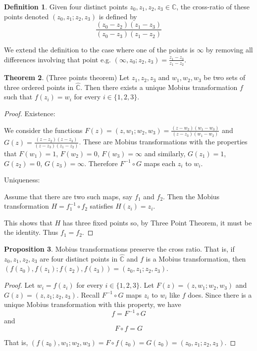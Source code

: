 \documentclass[12pt,a4paper]{article}
\theoremstyle{definition}
\newtheorem{definition}{Definition}[subsection]
\newtheorem{theorem}[definition]{Theorem}
\newtheorem{proposition}[definition]{Proposition}
\begin{document}
\begin{definition}
	Given four distinct points $z_0, z_1, z_2, z_3 \in \mathbb{C}$, the cross-ratio of these points denoted $(z_0, z_1; z_2, z_3)$ is defined by
	\[\frac{(z_0 - z_2)(z_1 - z_3)}{(z_0 - z_3)(z_1 - z_2)}\]

	We extend the definition to the case where one of the points is $\infty$ by removing all differences involving that point e.g. $(\infty, z_0; z_2, z_3) = \frac{z_1 - z_3}{z_1 - z_2}$.
\end{definition}

\begin{theorem}
	(Three points theorem)
	Let ${z_1, z_2, z_3}$ and ${w_1, w_2, w_3}$ be two sets of three ordered points in $\hat{\mathbb{C}}$. Then there exists a unique Mobius transformation $f$ such that $f(z_i) = w_i$ for every $i \in \{1, 2, 3\}$.
\end{theorem}

\begin{proof}
	Existence:

	We consider the functions $F(z) = (z, w_1; w_2, w_3) = \frac{(z - w_2)(w_1 - w_3)}{(z - z_3)(w_1 - w_2)}$ and $G(z) = \frac{(z - z_2)(z - z_3)}{(z - z_3)(z_1 - z_2)}$. These are Mobius transformations with the properties that $F(w_1) = 1$, $F(w_2) = 0$, $F(w_3) = \infty$ and similarly, $G(z_1) = 1$, $G(z_2) = 0$, $G(z_3) = \infty$. Therefore $F^{-1} \circ G$ maps each $z_i$ to $w_i$.

	Uniqueness:

	Assume that there are two such maps, say $f_1$ and $f_2$. Then the Mobius transformation $H = f_1 ^ {-1} \circ f_2$ satisfies $H(z_i) = z_i$.

	This shows that $H$ has three fixed points so, by Three Point Theorem, it must be the identity. Thus $f_1 = f_2$.
\end{proof}

\begin{proposition}
	Mobius transformations preserve the cross ratio. That is, if $z_0, z_1, z_2, z_3$ are four distinct points in $\hat{\mathbb{C}}$ and $f$ is a Mobius transformation, then $(f(z_0), f(z_1); f(z_2), f(z_3)) = (z_0, z_1; z_2, z_3)$.
\end{proposition}

\begin{proof}
	Let $w_i = f(z_i)$ for every $i \in \{1, 2, 3\}$. Let $F(z) = (z, w_1; w_2, w_3)$ and $G(z) = (z, z_1; z_2, z_3)$. Recall $F^{-1} \circ G$ maps $z_i$ to $w_i$ like $f$ does. Since there is a unique Mobius transformation with this property, we have \[f = F^{-1} \circ G\] and \[F \circ f = G\]

	That is, $(f(z_0), w_1; w_2, w_3) = F \circ f (z_0) = G(z_0) = (z_0, z_1; z_2, z_3)$.
\end{proof}
\end{document}

